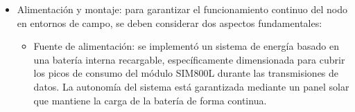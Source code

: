 \begin{itemize}
%
%
%
%
%
%
%
%
%
%
%
%
%
%
%

\item Alimentación y montaje: para garantizar el funcionamiento continuo del nodo en entornos de campo,
se deben considerar dos aspectos fundamentales:
\begin{itemize}
\item Fuente de alimentación: se implementó un sistema de energía basado en una batería interna recargable, específicamente dimensionada para cubrir los picos de consumo del módulo SIM800L durante las transmisiones de datos. La autonomía del sistema está garantizada mediante un panel solar que mantiene la carga de la batería de forma continua.


\end{itemize}
\end{itemize}
